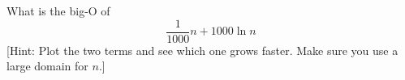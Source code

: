 What is the big-O of 
\[
\frac{1}{1000}n + 1000\ln n
\]
[Hint: Plot the two terms and see which one grows faster.
Make sure you use a large domain for $n$.]
